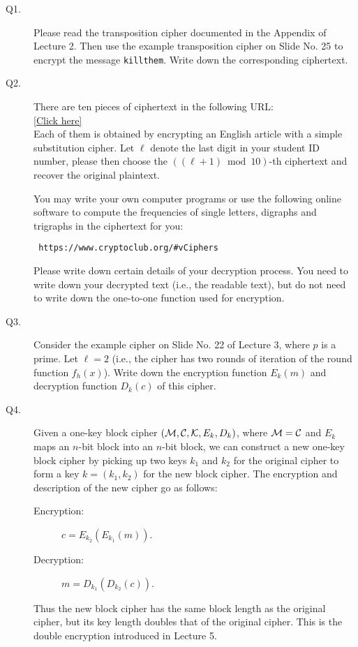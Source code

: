 \documentclass[11pt,epsfig]{article}
\newcommand{\cM}{{\cal M}}
\newcommand{\cC}{{\cal C}}
\newcommand{\cK}{{\cal K}}
\begin{document}
\begin{description}


\item[Q1.] 
Please read the transposition  cipher documented in the Appendix of Lecture 2. 
Then use the example transposition cipher on Slide No. 25 to encrypt the message 
\texttt{killthem}. Write down the corresponding ciphertext.  \hfill {} 


\item[Q2.] 
There are ten pieces of ciphertext in the following URL:  \\
 \href{https://home.cse.ust.hk/faculty/cding/COMP5631/c685-5.html}{[Click here]} \\
 Each of them is obtained by encrypting an English article with a simple substitution 
 cipher. Let $\ell$ denote the last digit in your student ID number, please then choose the 
 $((\ell +1) \bmod{10})$-th ciphertext and recover the original plaintext. 
 
 
 You may write your own computer programs or use the following online software to compute the frequencies of single 
 letters, digraphs and trigraphs in the ciphertext for you: 
 \begin{verbatim} 
 https://www.cryptoclub.org/#vCiphers
 \end{verbatim} 
 Please write down certain details of your decryption process. You need to write down your decrypted text (i.e., 
 the readable text), but do not need to write down the one-to-one function used for encryption.    
\hfill {}


\item[Q3.]
Consider the example cipher on Slide No. 22 of Lecture 3, where $p$ is a prime.  Let 
$\ell =2$ (i.e., the cipher has two rounds of iteration of the 
round function $f_h(x)$).  Write down the encryption function $E_k(m)$ and decryption function $D_k(c)$ of this cipher.     \hfill {} 


\item[Q4.] 
Given a one-key block cipher $(\cM, \cC, \cK, E_k, D_{k})$, where $\cM=\cC$ and $E_k$ 
maps an $n$-bit block into an $n$-bit block, we can 
construct a new one-key block cipher by picking up two keys $k_1$ and $k_2$ for the 
original cipher to form a key $k=(k_1,k_2)$ for the new block cipher. The 
encryption and description of the new cipher go as follows: 
\begin{description}
\item[Encryption:] $c=E_{k_2}(E_{k_1}(m))$. 
\item[Decryption:] $m=D_{k_1}(D_{k_2}(c))$.  
\end{description}
Thus the new block cipher has the same block length as the original cipher, 
but its key length doubles that of the original cipher. This is the double 
encryption introduced in Lecture 5. 


\end{description}
\end{document}

